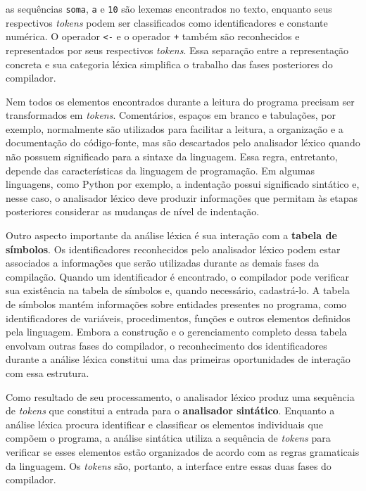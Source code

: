 \documentclass[
  brazilian,
  letterpaper,
]{book}
\theoremstyle{plain}
\theoremstyle{definition}
\theoremstyle{remark}
\begin{document}
as sequências \texttt{soma}, \texttt{a} e \texttt{10} são lexemas
encontrados no texto, enquanto seus respectivos \emph{tokens} podem ser
classificados como identificadores e constante numérica. O operador
\texttt{\textless{}-} e o operador \texttt{+} também são reconhecidos e
representados por seus respectivos \emph{tokens}. Essa separação entre a
representação concreta e sua categoria léxica simplifica o trabalho das
fases posteriores do compilador.

Nem todos os elementos encontrados durante a leitura do programa
precisam ser transformados em \emph{tokens}. Comentários, espaços em
branco e tabulações, por exemplo, normalmente são utilizados para
facilitar a leitura, a organização e a documentação do código-fonte, mas
são descartados pelo analisador léxico quando não possuem significado
para a sintaxe da linguagem. Essa regra, entretanto, depende das
características da linguagem de programação. Em algumas linguagens, como
Python por exemplo, a indentação possui significado sintático e, nesse
caso, o analisador léxico deve produzir informações que permitam às
etapas posteriores considerar as mudanças de nível de indentação.

Outro aspecto importante da análise léxica é sua interação com a
\textbf{tabela de símbolos}. Os identificadores reconhecidos pelo
analisador léxico podem estar associados a informações que serão
utilizadas durante as demais fases da compilação. Quando um
identificador é encontrado, o compilador pode verificar sua existência
na tabela de símbolos e, quando necessário, cadastrá-lo. A tabela de
símbolos mantém informações sobre entidades presentes no programa, como
identificadores de variáveis, procedimentos, funções e outros elementos
definidos pela linguagem. Embora a construção e o gerenciamento completo
dessa tabela envolvam outras fases do compilador, o reconhecimento dos
identificadores durante a análise léxica constitui uma das primeiras
oportunidades de interação com essa estrutura.

Como resultado de seu processamento, o analisador léxico produz uma
sequência de \emph{tokens} que constitui a entrada para o
\textbf{analisador sintático}. Enquanto a análise léxica procura
identificar e classificar os elementos individuais que compõem o
programa, a análise sintática utiliza a sequência de \emph{tokens} para
verificar se esses elementos estão organizados de acordo com as regras
gramaticais da linguagem. Os \emph{tokens} são, portanto, a interface
entre essas duas fases do compilador.
\end{document}
